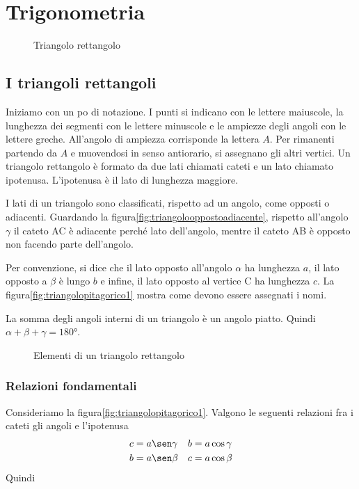 \chapter{Trigonometria}
\label{cha:trigonometria}
\minitoc
\mtcskip                                %
\minilof                                %
\mtcskip                                %
\minilot
\begin{figure}
	\centering
	
	\caption{Triangolo rettangolo}
	\label{fig:triangolopitagorico1}
\end{figure}
\section{I triangoli rettangoli}
Iniziamo con un po di notazione. I punti si indicano con le lettere maiuscole, la lunghezza dei segmenti con le lettere minuscole e le ampiezze degli angoli con le lettere greche. All'angolo di ampiezza corrisponde la lettera $A$. Per rimanenti partendo da $A$ e muovendosi in senso antiorario, si assegnano gli altri vertici. Un triangolo rettangolo è formato da due lati chiamati cateti e un lato chiamato ipotenusa. L'ipotenusa è il lato di lunghezza maggiore. 

I lati di un triangolo sono classificati, rispetto ad un angolo, come opposti o adiacenti. Guardando la figura\nobs\vref{fig:triangolooppostoadiacente}, rispetto all'angolo $\gamma$ il cateto AC è adiacente perché lato dell'angolo, mentre il cateto AB è opposto  non facendo parte dell'angolo. 
 
 Per convenzione, si dice che il lato opposto all'angolo $\alpha$ ha lunghezza $a$, il lato opposto a $\beta$ è lungo $b$ e infine, il lato opposto al vertice C ha lunghezza $c$. La figura\nobs\vref{fig:triangolopitagorico1} mostra come devono essere assegnati i nomi.
 
 La somma degli angoli interni di un triangolo è un angolo piatto. Quindi $\alpha+\beta+\gamma=\ang{180}$. 
\begin{figure}
	\centering
	
	\caption{Elementi di un triangolo rettangolo}
	\label{fig:triangolooppostoadiacente}
\end{figure}
\subsection{Relazioni fondamentali}
Consideriamo la figura\nobs\vref{fig:triangolopitagorico1}. Valgono le seguenti relazioni fra i cateti gli angoli e l'ipotenusa
\begin{align*}
c&=a\sen\gamma&b&=a\cos\gamma\\
b&=a\sen\beta&c&=a\cos\beta
\end{align*}
Quindi

